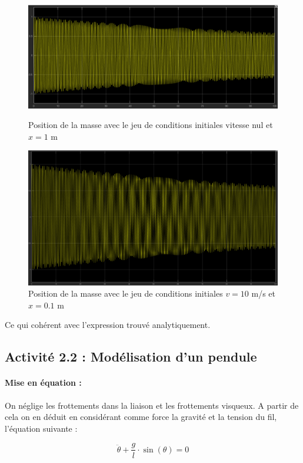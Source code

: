\documentclass[12pt,a4paper]{article}
\begin{document}
\begin{figure}[h!]
\centering
\includegraphics[width=.9\linewidth]{masse_resort.png}
\caption{Position de la masse avec le jeu de conditions initiales vitesse nul et $x=1$ m}
\includegraphics[width=.9\linewidth]{masse_resort2.png}
\caption{Position de la masse avec le jeu de conditions initiales $v=10$ m/s et $x=0.1$ m}
\end{figure}

Ce qui cohérent avec l'expression trouvé analytiquement.

\subsection{Activité 2.2 : Modélisation d'un pendule}
\paragraph{Mise en équation :} On néglige les frottements dans la liaison et les frottements visqueux. A partir de cela on en déduit en considérant comme force la gravité et la tension du fil, l'équation suivante :

\[ \ddot{\theta} + \dfrac{g}{l} \cdot \sin(\theta) = 0 \]
\end{document}

